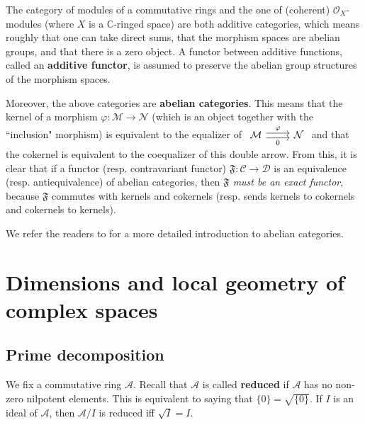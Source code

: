 \documentclass[12pt,b5paper,notitlepage]{report}
\theoremstyle{definition}
\theoremstyle{plain}
\newcommand{\fk}{\mathfrak}
\newcommand{\mc}{\mathcal}
\newcommand{\scr}{\mathscr}
\newcommand{\Cbb}{\mathbb C}
\numberwithin{equation}{section}
\begin{document}
\begin{subappendices}
The category of modules of a commutative rings and the one of (coherent) $\scr O_X$-modules (where $X$ is a $\Cbb$-ringed space) are both additive categories, which means roughly that one can take direct sums,  that the morphism spaces are abelian groups, and that there is a zero object. A functor between additive functions, called an \textbf{additive functor}, is assumed to preserve the abelian group structures of the morphism spaces. 

Moreover, the above categories are \textbf{abelian categories}. This means that the kernel of a morphism $\varphi:\mc M\rightarrow\mc N$ (which is an object together with the ``inclusion" morphism) is equivalent to the equalizer of $\begin{tikzcd}
\mc M \arrow[r,shift left, "\varphi"] \arrow[r,shift right,"0"'] & \mc N
\end{tikzcd}$
and that the cokernel is equivalent to the coequalizer of this double arrow. From this, it is clear that if a functor (resp. contravariant functor) $\fk F:\mc C\rightarrow\mc D$ is an equivalence (resp. antiequivalence) of abelian categories, then {\color{red}\emph{$\fk F$ must be an exact functor}}, because $\fk F$ commutes with kernels and cokernels (resp. sends kernels to cokernels and cokernels to kernels).



We refer the readers to \cite[Chapter 1]{Vak17} for a more detailed introduction to abelian categories.






\end{subappendices}












\chapter{Dimensions and local geometry of complex spaces}



\section{Prime decomposition}

We fix a commutative ring $\mc A$. Recall that $\mc A$ is called \textbf{reduced}  if $\mc A$ has no non-zero nilpotent elements. This is equivalent to saying that $\{0\}=\sqrt{\{0\}}$. If $I$ is an ideal of $\mc A$, then $\mc A/I$ is reduced iff $\sqrt{I}=I$.
\end{document}
